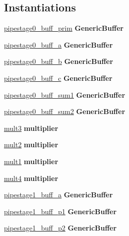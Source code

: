 \subsection*{Instantiations}
 \begin{DoxyCompactItemize}
\item 
\hyperlink{class_linear_regression_1_1_structural_a18083ee6230f5eaa964e698d28b33c8e}{pipestage0\+\_\+buff\+\_\+prim}  {\bfseries Generic\+Buffer}   
\item 
\hyperlink{class_linear_regression_1_1_structural_a2cc966f9e487a342b140941f0e08b0e3}{pipestage0\+\_\+buff\+\_\+a}  {\bfseries Generic\+Buffer}   
\item 
\hyperlink{class_linear_regression_1_1_structural_a9907462fa9f74221862307948f010a3f}{pipestage0\+\_\+buff\+\_\+b}  {\bfseries Generic\+Buffer}   
\item 
\hyperlink{class_linear_regression_1_1_structural_a2a2f46e1cff149263f8bdbf752ab030c}{pipestage0\+\_\+buff\+\_\+c}  {\bfseries Generic\+Buffer}   
\item 
\hyperlink{class_linear_regression_1_1_structural_a887437c4bb6b33e25dd4dda6a3a473d3}{pipestage0\+\_\+buff\+\_\+sum1}  {\bfseries Generic\+Buffer}   
\item 
\hyperlink{class_linear_regression_1_1_structural_a0713cfc68348d42071bc61be0790d6f5}{pipestage0\+\_\+buff\+\_\+sum2}  {\bfseries Generic\+Buffer}   
\item 
\hyperlink{class_linear_regression_1_1_structural_adf80c8ef67f9eb716830cfb9a6d3a980}{mult3}  {\bfseries multiplier}   
\item 
\hyperlink{class_linear_regression_1_1_structural_a7c5c7b6fb03b66e49b0eb767162f01a8}{mult2}  {\bfseries multiplier}   
\item 
\hyperlink{class_linear_regression_1_1_structural_abe2dbada52541335e367815bffe06c28}{mult1}  {\bfseries multiplier}   
\item 
\hyperlink{class_linear_regression_1_1_structural_a65ae62ab3b1e6675bf4e4bcf572d2025}{mult4}  {\bfseries multiplier}   
\item 
\hyperlink{class_linear_regression_1_1_structural_a273de05d7892fd1febb31d1c6fab5120}{pipestage1\+\_\+buff\+\_\+a}  {\bfseries Generic\+Buffer}   
\item 
\hyperlink{class_linear_regression_1_1_structural_aa4ecb297c24eee090576a63597934c3c}{pipestage1\+\_\+buff\+\_\+p1}  {\bfseries Generic\+Buffer}   
\item 
\hyperlink{class_linear_regression_1_1_structural_a9cb3bc10f620d667a657ecca4aa0b59a}{pipestage1\+\_\+buff\+\_\+p2}  {\bfseries Generic\+Buffer}   

\end{DoxyCompactItemize}
